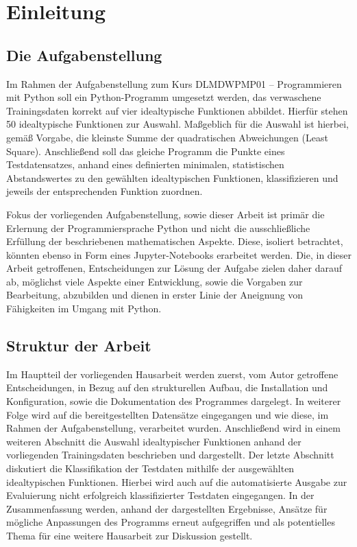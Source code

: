 \chapter{Einleitung}

\section{Die Aufgabenstellung}

Im Rahmen der Aufgabenstellung zum Kurs DLMDWPMP01 – Programmieren mit Python soll ein Python-Programm umgesetzt werden, das verwaschene Trainingsdaten korrekt auf vier idealtypische Funktionen abbildet. Hierfür stehen 50 idealtypische Funktionen zur Auswahl. Maßgeblich für die Auswahl ist hierbei, gemäß Vorgabe, die kleinste Summe der quadratischen Abweichungen (Least Square).
Anschließend soll das gleiche Programm die Punkte eines Testdatensatzes, anhand eines definierten minimalen, statistischen Abstandswertes zu den gewählten idealtypischen Funktionen, klassifizieren und jeweils der entsprechenden Funktion zuordnen.

Fokus der vorliegenden Aufgabenstellung, sowie dieser Arbeit ist primär die Erlernung der Programmiersprache Python und nicht die ausschließliche Erfüllung der beschriebenen mathematischen Aspekte. Diese, isoliert betrachtet, könnten ebenso in Form eines Jupyter-Notebooks erarbeitet werden. Die, in dieser Arbeit getroffenen, Entscheidungen zur Lösung der Aufgabe zielen daher darauf ab, möglichst viele Aspekte einer Entwicklung, sowie die Vorgaben zur Bearbeitung, abzubilden und dienen in erster Linie der Aneignung von Fähigkeiten im Umgang mit Python.


\section{Struktur der Arbeit}

Im Hauptteil der vorliegenden Hausarbeit werden zuerst, vom Autor getroffene Entscheidungen, in Bezug auf den strukturellen Aufbau, die Installation und Konfiguration, sowie die Dokumentation des Programmes dargelegt. 
In weiterer Folge wird auf die bereitgestellten Datensätze eingegangen und wie diese, im Rahmen der Aufgabenstellung, verarbeitet wurden.
Anschließend wird in einem weiteren Abschnitt die Auswahl idealtypischer Funktionen anhand der vorliegenden Trainingsdaten beschrieben und dargestellt.
Der letzte Abschnitt diskutiert die Klassifikation der Testdaten mithilfe der ausgewählten idealtypischen Funktionen. Hierbei wird auch auf die automatisierte Ausgabe zur Evaluierung nicht erfolgreich klassifizierter Testdaten eingegangen.
In der Zusammenfassung werden, anhand der dargestellten Ergebnisse, Ansätze für mögliche Anpassungen des Programms erneut aufgegriffen und als potentielles Thema für eine weitere Hausarbeit zur Diskussion gestellt.

